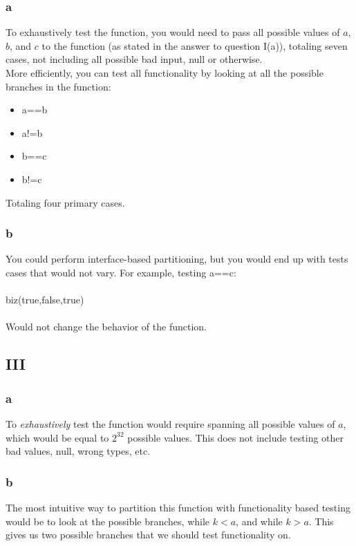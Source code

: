 \documentclass[10pt,letterpaper]{article}
\begin{document}
		\subsubsection*{a}
			To exhaustively test the function, you would need to
			pass all possible values of $a$, $b$, and $c$ to the
			function (as stated in the answer to question I(a)),
			totaling seven cases, not including all possible bad
			input, null or otherwise.\\
			More efficiently, you can test all functionality by
			looking at all the possible branches in the function:
			\begin{itemize}
				\item a==b
				\item a!=b
				\item b==c
				\item b!=c
			\end{itemize}
			Totaling four primary cases.

		\subsubsection*{b}
			You could perform interface-based partitioning, but you
			would end up with tests cases that would not vary. For
			example, testing a==c:\\\\
				biz(true,false,true)\\\\
			Would not change the behavior of the function.

	\subsection*{III}
	\subsubsection*{a}
		To \textit{exhaustively} test the function would require
		spanning all possible values of $a$, which would be equal to
		$2^{32}$ possible values. This does not include testing other
		bad values, null, wrong types, etc.

	\subsubsection*{b}
		The most intuitive way to partition this function with
		functionality based testing would be to look at the possible
		branches, while $k < a$, and while $k > a$. This gives us two
		possible branches that we should test functionality on.
\end{document}
